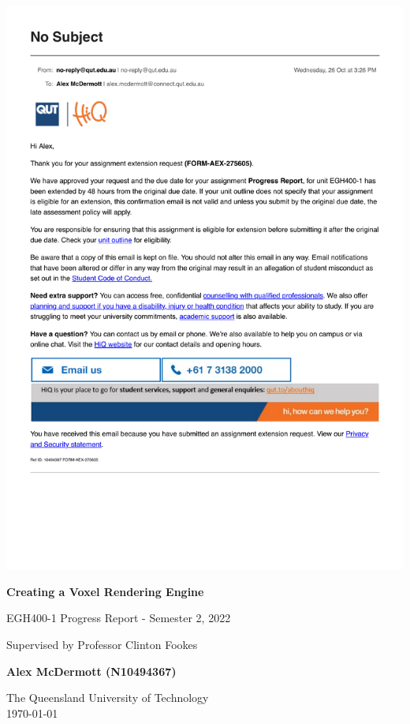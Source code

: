 \documentclass[titlepage]{article}
\begin{document}
\begin{center}
    \includegraphics[scale=0.75]{Extension.pdf}
\end{center}

\begin{titlepage}
    \begin{center}
        \vspace*{7cm}

        \Huge
        \textbf{Creating a Voxel Rendering Engine}

        \vspace{0.5cm}

        \Large
        EGH400-1 Progress Report - Semester 2, 2022

        \vspace{0.25cm}

        \large
        Supervised by Professor Clinton Fookes

        \vspace{0.5cm}

        \Large
        \textbf{Alex McDermott (N10494367)}

        \vfill

        \Large
        The Queensland University of Technology\\
        \today
    \end{center}
\end{titlepage}
\end{document}
